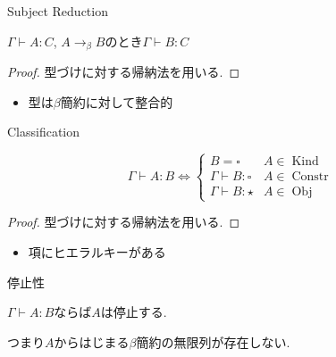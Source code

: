 \documentclass[18pt]{beamer}
\DeclareMathOperator{\Obj}{Obj}
\DeclareMathOperator{\Constr}{Constr}
\DeclareMathOperator{\Kind}{Kind}
\begin{document}
\begin{frame}{Subject Reduction}
\begin{thm}
 $\Gamma \vdash A \colon C$, $A \rightarrow_\beta B$のとき$\Gamma \vdash B \colon C$
\end{thm}
\begin{proof}
 型づけに対する帰納法を用いる.
\end{proof}
 \begin{itemize}
  \item 型は$\beta$簡約に対して整合的
 \end{itemize}
\end{frame}

\begin{frame}{Classification}
\begin{thm}
 \[
 \Gamma \vdash A \colon B \Leftrightarrow \begin{cases}
                                           B = \square & A \in \Kind\\
                                           \Gamma \vdash B \colon {\square} & A \in \Constr\\
                                           \Gamma \vdash B \colon {\star} & A \in \Obj
                                          \end{cases}
 \]
\end{thm}
\begin{proof}
 型づけに対する帰納法を用いる.
\end{proof}
 \begin{itemize}
  \item 項にヒエラルキーがある
 \end{itemize}
\end{frame}

\begin{frame}{停止性}
\begin{thm}
 $\Gamma \vdash A \colon B$ならば$A$は停止する.
 
 つまり$A$からはじまる$\beta$簡約の無限列が存在しない.
\end{thm}
\end{frame}
\end{document}

